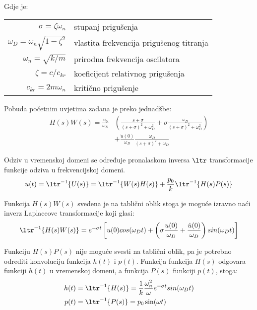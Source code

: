 Gdje je:\\
\begin{table}[H]
    \begin{tabular}{r l}
        $\sigma=\zeta\omega_n$ & stupanj prigušenja\\
        $\omega_D=\omega_n\sqrt{1-\zeta^2}$ & vlastita frekvencija prigušenog titranja\\
        $\omega_n=\sqrt{k/m}$ & prirodna frekvencija oscilatora\\
        $\zeta=c/c_{kr}$ & koeficijent relativnog prigušenja\\
        $c_{kr}=2m\omega_n$ & kritično prigušenje
    \end{tabular}
\end{table}

Pobuda početnim uvjetima zadana je preko jednadžbe:
\begin{equation}
    \begin{split}
        H(s)W(s)=\frac{u_0}{\omega_D}&\left(
        \frac{s+\sigma}{(s+\sigma)^2+\omega_D^2} +
	\sigma\frac{\omega_D}{(s+\sigma)^2+\omega_D^2}\right)\\
        &+ \frac{\dot{u}(0)}{\omega_D}\frac{\omega_D}{(s+\sigma)^2+\omega_D}
    \end{split}
\end{equation}

Odziv u vremenskoj domeni se određuje pronalaskom inversa $\ltr$ transformacije
funkcije odziva u frekvencijskoj domeni.
\begin{equation}
	u(t)=\ltr^{-1}\{U(s)\}=\ltr^{-1}\{W(s)H(s)\}+\frac{p_0}{k}\ltr^{-1}\{H(s)P(s)\}
	\label{eq:inverz_prvi_korak}
\end{equation}

Funkcija $H(s)W(s)$ svedena je na tablični oblik stoga je moguće izravno naći inverz
Laplaceove transformacije koji glasi:
\begin{equation}
	\ltr^{-1}\{H(s)W(s)\} = e^{-\sigma t}\left[
		u(0)cos(\omega_Dt)+\left(
			\sigma\frac{u(0)}{\omega_D}+\frac{\dot{u}(0)}{\omega_D}
			\right)sin(\omega_Dt)\right] \label{eq:pobuda_pocetnim_uvjetima}
\end{equation}

Funkciju $H(s)P(s)$ nije moguće svesti na tablični oblik, pa je potrebno odrediti
konvoluciju funkcija $h(t)$ i $p(t)$. Funkcija funkcija $H(s)$ odgovara funkciji 
$h(t)$ u vremenskoj domeni, a funkcija $P(s)$ funkciji $p(t)$, stoga:
\begin{align}
        h(t)&=\ltr^{-1}\{H(s)\}=\frac{1}{k}\frac{\omega_n^2}{\omega}e^{-\sigma t}sin(\omega_Dt)\label{eq:pfs_vremenska_domena}\\
	p(t)&=\ltr^{-1}\{P(s)\}=p_0\sin(\omega t) \label{eq:pobuda_vremenska_domena}
\end{align}

